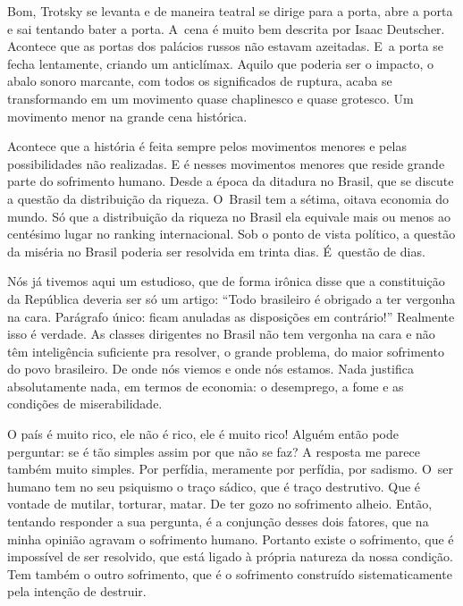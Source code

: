  

Bom, Trotsky se levanta e de maneira teatral se dirige para a porta,
abre a porta e sai tentando bater a porta. A~cena é muito bem descrita
por Isaac Deutscher. Acontece que as portas dos palácios russos não
estavam azeitadas. E~a porta se fecha lentamente, criando um anticlímax.
Aquilo que poderia ser o impacto, o abalo sonoro marcante, com todos os
significados de ruptura, acaba se transformando em um movimento quase
chaplinesco e quase grotesco. Um movimento menor na grande cena
histórica.

 

Acontece que a história é feita sempre pelos movimentos menores e pelas
possibilidades não realizadas. E é nesses movimentos menores que reside
grande parte do sofrimento humano. Desde a época da ditadura no Brasil,
que se discute a questão da distribuição da riqueza. O~Brasil tem a
sétima, oitava economia do mundo. Só que a distribuição da riqueza no
Brasil ela equivale mais ou menos ao centésimo lugar no ranking
internacional. Sob o ponto de vista político, a questão da miséria no
Brasil poderia ser resolvida em trinta dias. É~questão de dias.

 

Nós já tivemos aqui um estudioso, que de forma irônica disse que a
constituição da República deveria ser só um artigo: ``Todo brasileiro é
obrigado a ter vergonha na cara. Parágrafo único: ficam anuladas as
disposições em contrário!'' Realmente isso é verdade. As classes
dirigentes no Brasil não tem vergonha na cara e não têm inteligência
suficiente pra resolver, o grande problema, do maior sofrimento do povo
brasileiro. De onde nós viemos e onde nós estamos. Nada justifica
absolutamente nada, em termos de economia: o desemprego, a fome e as
condições de miserabilidade.

 

O país é muito rico, ele não é rico, ele é muito rico! Alguém então pode
perguntar: se é tão simples assim por que não se faz? A resposta me
parece também muito simples. Por perfídia, meramente por perfídia, por
sadismo. O~ser humano tem no seu psiquismo o traço sádico, que é traço
destrutivo. Que é vontade de mutilar, torturar, matar. De ter gozo no
sofrimento alheio. Então, tentando responder a sua pergunta, é a
conjunção desses dois fatores, que na minha opinião agravam o sofrimento
humano. Portanto existe o sofrimento, que é impossível de ser resolvido,
que está ligado à própria natureza da nossa condição. Tem também o outro
sofrimento, que é o sofrimento construído sistematicamente pela intenção
de destruir.

